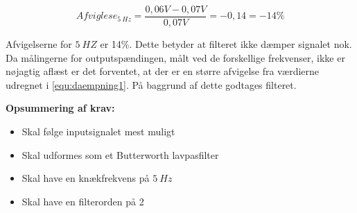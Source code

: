 \begin{equation} \label{equ:afvigelse1}
Afviglese_{5~Hz} = \frac{0,06V-0,07V}{0,07V} = -0,14  = - 14 \%
\end{equation}

\noindent 
Afvigelserne for $5~HZ$ er 14\%. Dette betyder at filteret ikke dæmper signalet nok. Da målingerne for outputspændingen, målt ved de forskellige frekvenser, ikke er nøjagtig aflæst er det forventet, at der er en større afvigelse fra værdierne udregnet i \autoref{equ:daempning1}. På baggrund af dette godtages filteret. 

\vspace{3mm}
\textbf{Opsummering af krav:}
\begin{itemize}
\item[\text{\sffamily \checkmark}] Skal følge inputsignalet mest muligt  
\item[\text{\sffamily \checkmark}] Skal udformes som et Butterworth lavpasfilter
\item[\text{\sffamily \checkmark}] Skal have en knækfrekvens på $5~Hz$
\item[\text{\sffamily \checkmark}] Skal have en filterorden på 2
\end{itemize}